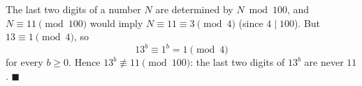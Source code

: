 The last two digits of a number $N$ are determined by $N\bmod100$, and $N\equiv11\pmod{100}$ would imply $N\equiv11\equiv3\pmod4$ (since $4\mid100$). But $13\equiv1\pmod4$, so
\[13^b\equiv1^b=1\pmod4\]
for every $b\ge0$. Hence $13^b\not\equiv11\pmod{100}$: the last two digits of $13^b$ are never $11$. $\blacksquare$
